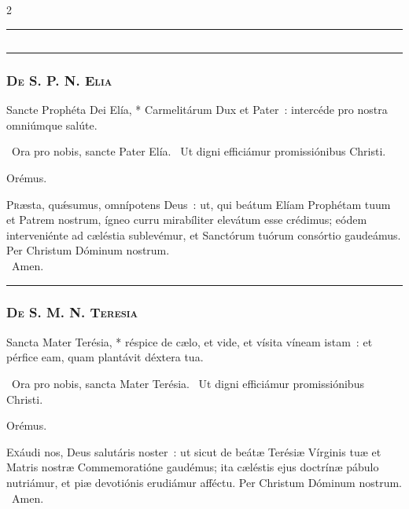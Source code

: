 \documentclass[9pt,twoside]{extarticle}
\begin{document}
\begin{multicols}{2}
\begin{center}\textcolor{red}{\rule{\linewidth}{0.5pt}} \end{center}

\subsection*{\center \textsc{}}
\subsubsection*{\center {}}

\begin{center}\textcolor{red}{\rule{\linewidth}{0.5pt}} \end{center}

\subsubsection*{\center \textsc{De S. P. N. Elia}}
\begin{tightlist}{}
\item {} Sancte Prophéta Dei Elía, * Carmelitárum Dux et Pater~: intercéde pro nostra omniúmque salúte.
\item {}~Ora pro nobis, sancte Pater Elía. ~Ut digni efficiámur promissiónibus Christi.
\item Orémus. \hfill {}
\end{tightlist}
\lettrine{P}ræsta, quǽsumus, omnípotens Deus~: ut, qui beátum Elíam Prophétam tuum et Patrem nostrum, ígneo curru mirabíliter elevátum esse crédimus; eódem interveniénte ad cæléstia sublevémur, et Sanctórum tuórum consórtio gaudeámus. Per Christum Dóminum nostrum.\\
~Amen.

\begin{center}\textcolor{red}{\rule{\linewidth}{0.5pt}} \end{center}

\subsubsection*{\center \textsc{De S. M. N. Teresia}}
\begin{tightlist}{}
\item {} Sancta Mater Terésia, * réspice de cælo, et vide, et vísita víneam istam~: et pérfice eam, quam plantávit déxtera tua.
\item {}~Ora pro nobis, sancta Mater Terésia. ~Ut digni efficiámur promissiónibus Christi.
\item Orémus. \hfill {}
\end{tightlist}
\lettrine{E}xáudi nos, Deus salutáris noster~: ut sicut de beátæ Terésiæ Vírginis tuæ et Matris nostræ Commemoratióne gaudémus; ita cæléstis ejus doctrínæ pábulo nutriámur, et piæ devotiónis erudiámur afféctu. Per Christum Dóminum nostrum. ~Amen.


\end{multicols}
\end{document}
